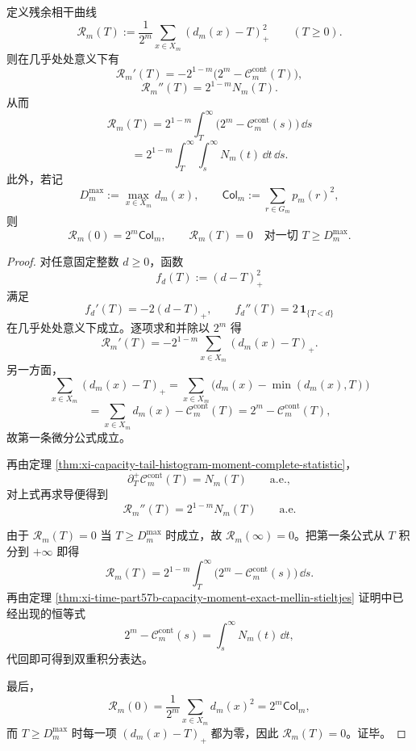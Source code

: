 \begin{theorem}[残余相干曲线的微分结构]\label{thm:xi-time-part9m3-residual-coherence-differential-calculus}
定义残余相干曲线
\[
\mathscr R_m(T):=
\frac{1}{2^m}\sum_{x\in X_m}(d_m(x)-T)_+^2
\qquad
(T\ge 0).
\]
则在几乎处处意义下有
\[
\mathscr R_m'(T)
=
-2^{1-m}\bigl(2^m-\mathcal C_m^{\mathrm{cont}}(T)\bigr),
\]
\[
\mathscr R_m''(T)=2^{1-m}N_m(T).
\]
从而
\[
\mathscr R_m(T)
=
2^{1-m}\int_T^\infty
\bigl(2^m-\mathcal C_m^{\mathrm{cont}}(s)\bigr)\,\dd s
\]
\[
=
2^{1-m}\int_T^\infty\int_s^\infty N_m(t)\,\dd t\,\dd s.
\]
此外，若记
\[
D_m^{\max}:=\max_{x\in X_m}d_m(x),
\qquad
\mathsf{Col}_m:=\sum_{r\in G_m}p_m(r)^2,
\]
则
\[
\mathscr R_m(0)=2^m\mathsf{Col}_m,
\qquad
\mathscr R_m(T)=0
\quad
\text{对一切 }T\ge D_m^{\max}.
\]
\end{theorem}
\begin{proof}
对任意固定整数 \(d\ge 0\)，函数
\[
f_d(T):=(d-T)_+^2
\]
满足
\[
f_d'(T)=-2(d-T)_+,
\qquad
f_d''(T)=2\,\mathbf 1_{\{T<d\}}
\]
在几乎处处意义下成立。逐项求和并除以 \(2^m\) 得
\[
\mathscr R_m'(T)
=
-2^{1-m}\sum_{x\in X_m}(d_m(x)-T)_+.
\]
另一方面，
\[
\sum_{x\in X_m}(d_m(x)-T)_+
=
\sum_{x\in X_m}\bigl(d_m(x)-\min(d_m(x),T)\bigr)
\]
\[
=
\sum_{x\in X_m}d_m(x)-\mathcal C_m^{\mathrm{cont}}(T)
=
2^m-\mathcal C_m^{\mathrm{cont}}(T),
\]
故第一条微分公式成立。

再由定理 \ref{thm:xi-capacity-tail-histogram-moment-complete-statistic}，
\[
\partial_T^+\mathcal C_m^{\mathrm{cont}}(T)=N_m(T)
\qquad
\text{a.e.},
\]
对上式再求导便得到
\[
\mathscr R_m''(T)=2^{1-m}N_m(T)
\qquad
\text{a.e.}
\]

由于 \(\mathscr R_m(T)=0\) 当 \(T\ge D_m^{\max}\) 时成立，故 \(\mathscr R_m(\infty)=0\)。把第一条公式从 \(T\) 积分到 \(+\infty\) 即得
\[
\mathscr R_m(T)
=
2^{1-m}\int_T^\infty
\bigl(2^m-\mathcal C_m^{\mathrm{cont}}(s)\bigr)\,\dd s.
\]
再由定理 \ref{thm:xi-time-part57b-capacity-moment-exact-mellin-stieltjes} 证明中已经出现的恒等式
\[
2^m-\mathcal C_m^{\mathrm{cont}}(s)
=
\int_s^\infty N_m(t)\,\dd t,
\]
代回即可得到双重积分表达。

最后，
\[
\mathscr R_m(0)
=
\frac{1}{2^m}\sum_{x\in X_m}d_m(x)^2
=
2^m\mathsf{Col}_m,
\]
而 \(T\ge D_m^{\max}\) 时每一项 \((d_m(x)-T)_+\) 都为零，因此 \(\mathscr R_m(T)=0\)。证毕。
\end{proof}


